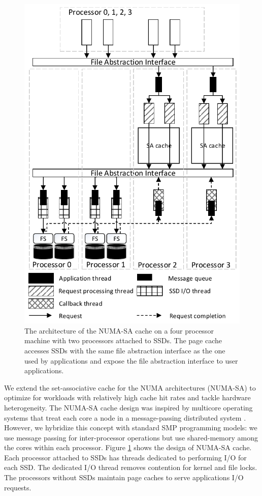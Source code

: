 \begin{figure}[t]
\centering
\includegraphics[scale=0.7]{figs/SAFS/NUMA-design.pdf}
\vspace{-5pt}
\caption{The architecture of the NUMA-SA cache on a four processor machine with 
two processors attached to SSDs. The page cache accesses SSDs with the same file
abstraction interface as the one used by applications and expose the file
abstraction interface to user applications.}
\label{numa_arch}
\vspace{-5pt}
\end{figure}

We extend the set-associative cache for the NUMA architectures
(NUMA-SA) to optimize for workloads with relatively high cache hit
rates and tackle hardware heterogeneity.
The NUMA-SA cache design was inspired by multicore operating systems that treat each 
core a node in a message-passing distributed system \cite{barrelfish}.  
However, we hybridize this concept with standard SMP programming models:  
we use message passing for inter-processor operations but use shared-memory among the 
cores within each processor.  Figure \ref{numa_arch} shows the design of NUMA-SA cache.
Each processor attached to SSDs has threads dedicated to performing I/O
for each SSD. The dedicated I/O thread removes contention for kernel and file locks.  
The processors without SSDs maintain page caches to serve applications I/O
requests.

